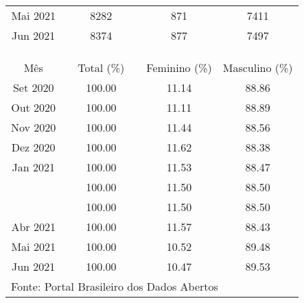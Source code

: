\documentclass[12pt]{article}
\begin{document}
\begin{table}[htbp]
\begin{adjustbox}{max width=\linewidth}
\begin{tabular}{p{7.5em}lllll}
    \multicolumn{1}{c}{Mai 2021} &      & \multicolumn{1}{c}{8282} &      & \multicolumn{1}{c}{871} & \multicolumn{1}{c}{7411} \\
    \multicolumn{1}{c}{Jun 2021} &      & \multicolumn{1}{c}{8374} &      & \multicolumn{1}{c}{877} & \multicolumn{1}{c}{7497} \\
\cmidrule{1-3}\cmidrule{5-6}    \multicolumn{1}{r}{} &      &      &      &      &  \\
    \multicolumn{1}{r}{} &      &      &      &      &  \\
    \multicolumn{1}{r}{} &      &      &      & \multicolumn{2}{c}{} \\
\cmidrule{1-3}\cmidrule{5-6}    \multicolumn{1}{c}{Mês} &      & \multicolumn{1}{c}{Total (\%)} &      & \multicolumn{1}{c}{Feminino (\%)} & \multicolumn{1}{c}{Masculino (\%)} \\
\cmidrule{1-3}\cmidrule{5-6}    \multicolumn{1}{c}{Set 2020} &      & \multicolumn{1}{c}{100.00} &      & \multicolumn{1}{c}{11.14} & \multicolumn{1}{c}{88.86} \\
    \multicolumn{1}{c}{Out 2020} &      & \multicolumn{1}{c}{100.00} &      & \multicolumn{1}{c}{11.11} & \multicolumn{1}{c}{88.89} \\
    \multicolumn{1}{c}{Nov 2020} &      & \multicolumn{1}{c}{100.00} &      & \multicolumn{1}{c}{11.44} & \multicolumn{1}{c}{88.56} \\
    \multicolumn{1}{c}{Dez 2020} &      & \multicolumn{1}{c}{100.00} &      & \multicolumn{1}{c}{11.62} & \multicolumn{1}{c}{88.38} \\
    \multicolumn{1}{c}{Jan 2021} &      & \multicolumn{1}{c}{100.00} &      & \multicolumn{1}{c}{11.53} & \multicolumn{1}{c}{88.47} \\
    \rowcolor[rgb]{ .851,  .851,  .851} \multicolumn{1}{c}{Fev 2021} &      & \multicolumn{1}{c}{100.00} &      & \multicolumn{1}{c}{11.50} & \multicolumn{1}{c}{88.50} \\
    \rowcolor[rgb]{ .851,  .851,  .851} \multicolumn{1}{c}{Mar 2021} &      & \multicolumn{1}{c}{100.00} &      & \multicolumn{1}{c}{11.50} & \multicolumn{1}{c}{88.50} \\
    \multicolumn{1}{c}{Abr 2021} &      & \multicolumn{1}{c}{100.00} &      & \multicolumn{1}{c}{11.57} & \multicolumn{1}{c}{88.43} \\
    \multicolumn{1}{c}{Mai 2021} &      & \multicolumn{1}{c}{100.00} &      & \multicolumn{1}{c}{10.52} & \multicolumn{1}{c}{89.48} \\
    \multicolumn{1}{c}{Jun 2021} &      & \multicolumn{1}{c}{100.00} &      & \multicolumn{1}{c}{10.47} & \multicolumn{1}{c}{89.53} \\
    \midrule
    \multicolumn{6}{p{35em}}{Fonte: Portal Brasileiro dos Dados Abertos} \\
    \end{tabular}%
    \end{adjustbox}
  \label{tab:sexo}%
\end{table}%
\end{document}
